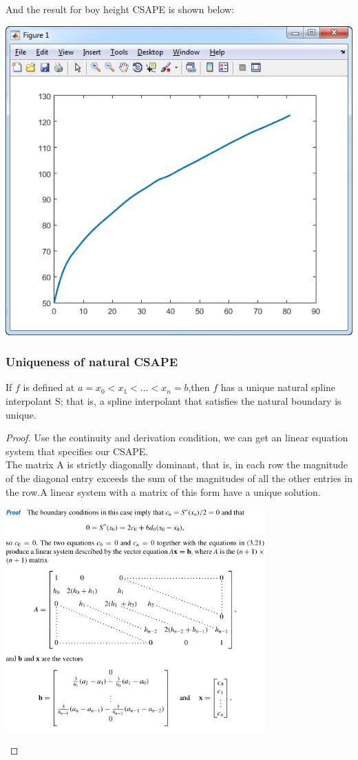 \documentclass[
10pt, %
a4paper, %
oneside, %
headinclude,footinclude, %
BCOR5mm, %
]{scrartcl}
\begin{document}
And the result for boy height CSAPE is shown below:
\begin{center}
  \includegraphics[width=.5\columnwidth]{./fig/CSresult.png}
\end{center}
\subsubsection{Uniqueness of natural CSAPE}
\begin{theorem}
If $f$ is defined at $a = x_0 < x_1 < ... < x_n = b$,then $f$ has a unique natural spline interpolant S; that is, a spline interpolant that satisfies the natural boundary is unique.
\end{theorem}
\begin{proof}
Use the continuity and derivation condition, we can get an linear equation system that specifies our CSAPE.\\
The matrix A is strictly diagonally dominant, that is, in each row the magnitude of the
diagonal entry exceeds the sum of the magnitudes of all the other entries in the row.A linear
system with a matrix of this form have a
unique solution.
\begin{center}
  \includegraphics[width=10cm]{./fig/lecture2.png}\\
\end{center}
\end{proof}
\end{document}
